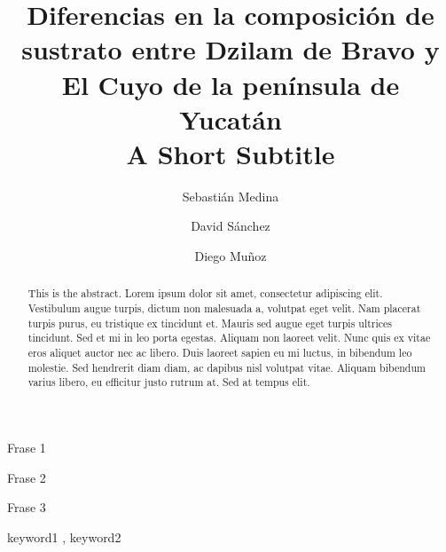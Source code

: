\documentclass[
  authoryear,
  preprint,
  3p,
  twocolumn]{elsarticle}
\begin{document}
\begin{frontmatter}
\title{Diferencias en la composición de sustrato entre Dzilam de Bravo y
El Cuyo de la península de Yucatán \\\large{A Short Subtitle} }
\author[1]{Sebastián Medina%
%
}
\author[1]{David Sánchez%
%
}
\author[1]{Diego Muñoz%
%
}


        
\begin{abstract}
This is the abstract. Lorem ipsum dolor sit amet, consectetur adipiscing
elit. Vestibulum augue turpis, dictum non malesuada a, volutpat eget
velit. Nam placerat turpis purus, eu tristique ex tincidunt et. Mauris
sed augue eget turpis ultrices tincidunt. Sed et mi in leo porta
egestas. Aliquam non laoreet velit. Nunc quis ex vitae eros aliquet
auctor nec ac libero. Duis laoreet sapien eu mi luctus, in bibendum leo
molestie. Sed hendrerit diam diam, ac dapibus nisl volutpat vitae.
Aliquam bibendum varius libero, eu efficitur justo rutrum at. Sed at
tempus elit.
\end{abstract}



\begin{highlights}
\item Frase 1\item Frase 2\item Frase 3
\end{highlights}


\begin{keyword}
    keyword1 \sep 
    keyword2
\end{keyword}
\end{frontmatter}
    \ifdefined\Shaded\renewenvironment{Shaded}{\begin{tcolorbox}[breakable, frame hidden, boxrule=0pt, interior hidden, borderline west={3pt}{0pt}{shadecolor}, enhanced, sharp corners]}{\end{tcolorbox}}\fi
\end{document}
